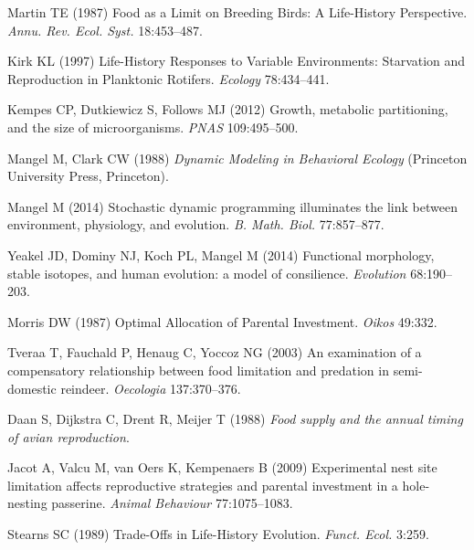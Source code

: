 \documentclass{pnastwo}
\begin{document}
\begin{article}
%

\begin{thebibliography}{10}

Martin TE
\newblock (1987) {Food as a Limit on Breeding Birds: A Life-History
  Perspective}.
\newblock \emph{Annu. Rev. Ecol. Syst.} 18:453--487.

Kirk KL
\newblock (1997) {Life-History Responses to Variable Environments: Starvation
  and Reproduction in Planktonic Rotifers}.
\newblock \emph{Ecology} 78:434--441.

Kempes CP, Dutkiewicz S, Follows MJ
\newblock (2012) {Growth, metabolic partitioning, and the size of
  microorganisms.}
\newblock \emph{PNAS} 109:495--500.

Mangel M, Clark CW
\newblock (1988) \emph{{Dynamic Modeling in Behavioral Ecology}}
\newblock (Princeton University Press, Princeton).

Mangel M
\newblock (2014) {Stochastic dynamic programming illuminates the link between
  environment, physiology, and evolution}.
\newblock \emph{B. Math. Biol.} 77:857--877.

Yeakel JD, Dominy NJ, Koch PL, Mangel M
\newblock (2014) {Functional morphology, stable isotopes, and human evolution:
  a model of consilience}.
\newblock \emph{Evolution} 68:190--203.

Morris DW
\newblock (1987) {Optimal Allocation of Parental Investment}.
\newblock \emph{Oikos} 49:332.

Tveraa T, Fauchald P, Henaug C, Yoccoz NG
\newblock (2003) {An examination of a compensatory relationship between food
  limitation and predation in semi-domestic reindeer}.
\newblock \emph{Oecologia} 137:370--376.

Daan S, Dijkstra C, Drent R, Meijer T
\newblock (1988) \emph{{Food supply and the annual timing of avian
  reproduction}}.

Jacot A, Valcu M, van Oers K, Kempenaers B
\newblock (2009) {Experimental nest site limitation affects reproductive
  strategies and parental investment in a hole-nesting passerine}.
\newblock \emph{Animal Behaviour} 77:1075--1083.

Stearns SC
\newblock (1989) {Trade-Offs in Life-History Evolution}.
\newblock \emph{Funct. Ecol.} 3:259.


\end{thebibliography}
\end{article}
\end{document}
